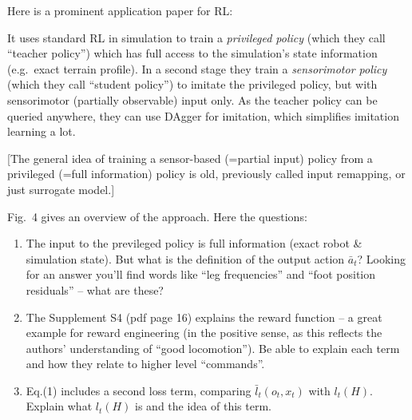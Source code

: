 

\renewcommand{\course}{Robot Learning}
\renewcommand{\coursedate}{Summer 2024}
\renewcommand{\exnum}{Weekly Exercise 6}

\renewcommand{\teacher}{Marc Toussaint \& Wolfgang H{\"o}nig}
\renewcommand{\addressTUB}{
  Learning~\&~Intelligent~Systems Lab, Intelligent Multi-Robot Coordination Lab, TU~Berlin\\\small
  Marchstr. 23, 10587 Berlin, Germany
}

\exercises




\exercisestitle



Here is a prominent application paper for RL:


It uses standard RL in simulation to train a \emph{privileged policy} (which they call ``teacher policy'') which has full access to the simulation's state information (e.g.\ exact terrain profile). In a second stage they train a \emph{sensorimotor policy} (which they call ``student policy'') to imitate the privileged policy, but with sensorimotor (partially observable) input only. As the teacher policy can be queried anywhere, they can use DAgger for imitation, which simplifies imitation learning a lot.

{\tiny[The general idea of training a sensor-based (=partial input) policy from a privileged (=full information) policy is old, previously called input remapping, or just surrogate model.]\par}

Fig.~4 gives an overview of the approach. Here the questions:
\begin{enumerate}
\item The input to the previleged policy is full information (exact
robot \& simulation state). But what is the definition of the output
action $\bar a_t$? Looking for an answer you'll find words like ``leg
frequencies'' and ``foot position residuals'' -- what are these?

\item The Supplement S4 (pdf page 16) explains the reward function --
a great example for reward engineering (in the positive sense, as this
reflects the authors' understanding of ``good locomotion''). Be able
to explain each term and how they relate to higher level ``commands''.


\item Eq.(1) includes a second loss term, comparing $\bar l_t(o_t,
x_t)$ with $l_t(H)$. Explain what $l_t(H)$ is and the idea of this
term.

\end{enumerate}

